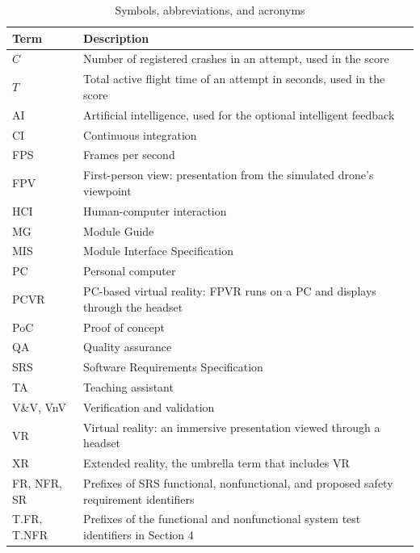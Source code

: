 \documentclass[12pt, titlepage]{article}
\begin{document}
\begin{table}[H]
\centering
\caption{Symbols, abbreviations, and acronyms}
\label{tab:symbols}
\renewcommand{\arraystretch}{1.2}
\begin{tabularx}{\textwidth}{@{}p{}>{\raggedright\arraybackslash}X@{}}
\toprule
\textbf{Term} & \textbf{Description}\\
\midrule
\(C\) & Number of registered crashes in an attempt, used in the score\\
\(T\) & Total active flight time of an attempt in seconds, used in the score\\
AI\hypertarget{abbr:AI}{} & Artificial intelligence, used for the optional intelligent feedback\\
CI\hypertarget{abbr:CI}{} & Continuous integration\\
FPS\hypertarget{abbr:FPS}{} & Frames per second\\
FPV\hypertarget{abbr:FPV}{} & First-person view: presentation from the simulated drone's viewpoint\\
HCI\hypertarget{abbr:HCI}{} & Human-computer interaction\\
MG\hypertarget{abbr:MG}{} & Module Guide\\
MIS\hypertarget{abbr:MIS}{} & Module Interface Specification\\
PC\hypertarget{abbr:PC}{} & Personal computer\\
PCVR\hypertarget{abbr:PCVR}{} & PC-based virtual reality: FPVR runs on a PC and displays through the headset\\
PoC\hypertarget{abbr:PoC}{} & Proof of concept\\
QA\hypertarget{abbr:QA}{} & Quality assurance\\
SRS\hypertarget{abbr:SRS}{} & Software Requirements Specification\\
TA\hypertarget{abbr:TA}{} & Teaching assistant\\
V\&V, VnV\hypertarget{abbr:VnV}{} & Verification and validation\\
VR\hypertarget{abbr:VR}{} & Virtual reality: an immersive presentation viewed through a headset\\
XR\hypertarget{abbr:XR}{} & Extended reality, the umbrella term that includes VR\\
FR, NFR, SR & Prefixes of SRS functional, nonfunctional, and proposed safety requirement identifiers\\
T.FR, T.NFR & Prefixes of the functional and nonfunctional system test identifiers in Section 4\\
\bottomrule
\end{tabularx}
\end{table}
\end{document}
